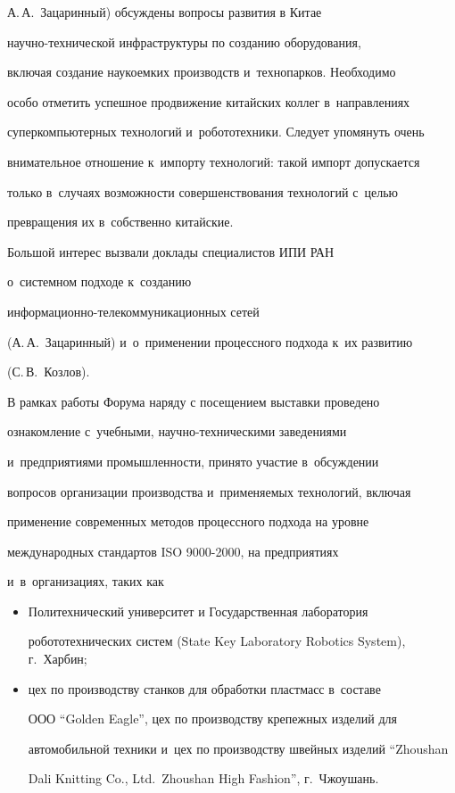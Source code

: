 А.\,А.~Зацаринный) обсуждены вопросы развития в Китае


    на\-уч\-но-тех\-ни\-че\-ской инфраструктуры по созданию оборудования,


включая создание наукоемких производств и~технопарков. Необходимо


особо отметить успешное продвижение китайских коллег в~направлениях


суперкомпьютерных технологий и~робототехники. Следует упомянуть очень


внимательное отношение к~импорту технологий: такой импорт допускается


только в~случаях возможности совершенствования технологий \mbox{с~целью}


превращения их в~собственно китайские.










    Большой интерес вызвали доклады специалистов ИПИ РАН


о~системном подходе к~созданию


    ин\-фор\-ма\-ци\-он\-но-те\-ле\-ком\-му\-ни\-ка\-ци\-он\-ных сетей


(А.\,А.~Зацаринный) и~о~применении процессного подхода к~их развитию


(С.\,В.~Козлов).





    В рамках работы Форума наряду с посещением выставки проведено


ознакомление с~учебными, на\-уч\-но-тех\-ни\-че\-ски\-ми заведениями


и~предприятиями промышленности, принято участие в~обсуждении


вопросов организации производства и~применяемых технологий, включая


применение современных методов процессного подхода на уровне


международных стандартов ISO 9000-2000, на предприятиях


и~в~организациях, таких как


    \begin{itemize}


    \item Политехнический университет и Государственная лаборатория


робототехнических систем (State Key Laboratory Robotics System), г.~Харбин;


    \item цех по производству станков для обработки пластмасс в~составе


ООО ``Golden Eagle'', цех по производству крепежных изделий для


автомобильной техники и~цех по производству швейных изделий ``Zhoushan


Dali Knitting Co., Ltd.\ Zhoushan High Fashion'', г.~Чжоушань.


    \end{itemize}





